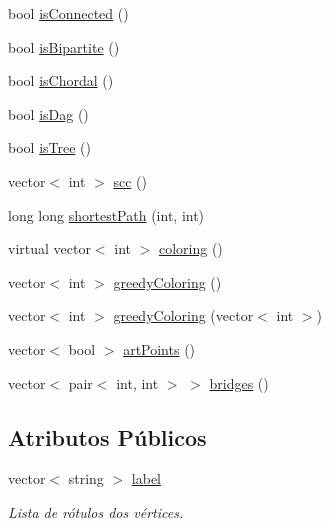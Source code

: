 \begin{DoxyCompactItemize}
\item 
bool \mbox{\hyperlink{classGraphGen_addc27f1b1daa452bb0943c867b550906}{is\+Connected}} ()
\item 
bool \mbox{\hyperlink{classGraphGen_a41afdf97face9260e82749c4c770b2e7}{is\+Bipartite}} ()
\item 
bool \mbox{\hyperlink{classGraphGen_aac3e93061f340c6855aa54ed73922f47}{is\+Chordal}} ()
\item 
bool \mbox{\hyperlink{classGraphGen_ab4923b690b5fe013f35377b849bb6609}{is\+Dag}} ()
\item 
bool \mbox{\hyperlink{classGraphGen_adffd99540a68b2c158cc1b089ccfd550}{is\+Tree}} ()
\item 
vector$<$ int $>$ \mbox{\hyperlink{classGraphGen_a875733956a1f667d68afb420f53ecc86}{scc}} ()
\item 
long long \mbox{\hyperlink{classGraphGen_ad42fcde82e163baadcfaa02293242db5}{shortest\+Path}} (int, int)
\item 
virtual vector$<$ int $>$ \mbox{\hyperlink{classGraphGen_ad44c80646f694460fafa3e3657beb4d0}{coloring}} ()
\item 
vector$<$ int $>$ \mbox{\hyperlink{classGraphGen_a8505ba4cbaa0685f43e52a4c4f296dc1}{greedy\+Coloring}} ()
\item 
vector$<$ int $>$ \mbox{\hyperlink{classGraphGen_a0690c98ce5c9dd544074f690fb79a8c6}{greedy\+Coloring}} (vector$<$ int $>$)
\item 
vector$<$ bool $>$ \mbox{\hyperlink{classGraphGen_abfc9e2946585f5ea7e2948cd724d37e8}{art\+Points}} ()
\item 
vector$<$ pair$<$ int, int $>$ $>$ \mbox{\hyperlink{classGraphGen_ac80b65f7234db5bc163c7736aa0f561a}{bridges}} ()
\end{DoxyCompactItemize}
\subsection*{Atributos Públicos}
\begin{DoxyCompactItemize}
\item 
\mbox{\label{classGraphGen_a59a950a3a5b8d5f3bda7b544a83248ed}} 
vector$<$ string $>$ \mbox{\hyperlink{classGraphGen_a59a950a3a5b8d5f3bda7b544a83248ed}{label}}
\begin{DoxyCompactList}\small\item\em Lista de rótulos dos vértices. \end{DoxyCompactList}\end{DoxyCompactItemize}
